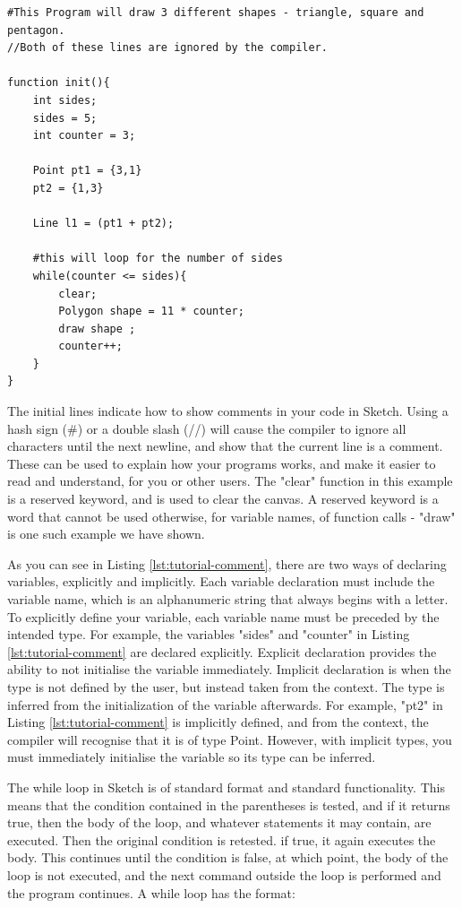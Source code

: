\documentclass{l3proj}
\begin{document}
\begin{lstlisting}[caption={Comments and Point Addition},label={lst:tutorial-comment}]
#This Program will draw 3 different shapes - triangle, square and pentagon.
//Both of these lines are ignored by the compiler.

function init(){
	int sides;
	sides = 5;
    int counter = 3;
    
    Point pt1 = {3,1}
    pt2 = {1,3}
    
    Line l1 = (pt1 + pt2);
    
    #this will loop for the number of sides
    while(counter <= sides){
        clear;
        Polygon shape =	11 * counter;
        draw shape ;
        counter++;
    }
}
\end{lstlisting}

The initial lines indicate how to show comments in your code in Sketch. Using a hash sign (\#) or a double slash (//) will cause the compiler to ignore all characters until the next newline, and show that the current line is a comment. These can be used to explain how your programs works, and make it easier to read and understand, for you or other users. The "clear" function in this example is a reserved keyword, and is used to clear the canvas. A reserved keyword is a word that cannot be used otherwise, for variable names, of function calls - "draw" is one such example we have shown.

As you can see in Listing \ref{lst:tutorial-comment}, there are two ways of declaring variables, explicitly and implicitly. Each variable declaration must include the variable name, which is an alphanumeric string that always begins with a letter. To explicitly define your variable, each variable name must be preceded by the intended type. For example, the variables "sides" and "counter" in Listing \ref{lst:tutorial-comment} are declared explicitly. Explicit declaration provides the ability to not initialise the variable immediately. Implicit declaration is when the type is not defined by the user, but instead taken from the context. The type is inferred from the initialization of the variable afterwards. For example, "pt2" in Listing \ref{lst:tutorial-comment} is implicitly defined, and from the context, the compiler will recognise that it is of type Point. However, with implicit types, you must immediately initialise the variable so its type can be inferred.

The while loop in Sketch is of standard format and standard functionality. This means that the condition contained in the parentheses is tested, and if it returns true, then the body of the loop, and whatever statements it may contain, are executed. Then the original condition is retested. if true, it again executes the body. This continues until the condition is false, at which point, the body of the loop is not executed, and the next command outside the loop is performed and the program continues. A while loop has the format: 
\end{document}
